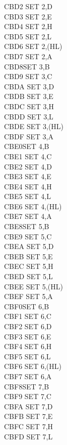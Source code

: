 \documentclass[twoside,openright,a4paper]{book}
\begin{document}
\begin{multicols}{3}
{\begin{tabbing}
	CBD2\> 	SET 2,D\\
	CBD3\> 	SET 2,E\\
	CBD4\> 	SET 2,H\\
	CBD5\> 	SET 2,L\\
	CBD6\> 	SET 2,(HL)\\
	CBD7\> 	SET 2,A\\
	CBD8\>SET 3,B\\
	CBD9\> 	SET 3,C\\
	CBDA\> 	SET 3,D\\
	CBDB\> 	SET 3,E\\
	CBDC\> 	SET 3,H\\
	CBDD\> 	SET 3,L\\
	CBDE\> 	SET 3,(HL)\\
	CBDF\> 	SET 3,A\\
	CBE0\>SET 4,B\\
	CBE1\> 	SET 4,C\\
	CBE2\> 	SET 4,D\\
	CBE3\> 	SET 4,E\\
	CBE4\> 	SET 4,H\\
	CBE5\> 	SET 4,L\\
	CBE6\> 	SET 4,(HL)\\
	CBE7\> 	SET 4,A\\
	CBE8\>SET 5,B\\
	CBE9\> 	SET 5,C\\
	CBEA\> 	SET 5,D\\
	CBEB\> 	SET 5,E\\
	CBEC\> 	SET 5,H\\
	CBED\> 	SET 5,L\\
	CBEE\> 	SET 5,(HL)\\
	CBEF\> 	SET 5,A\\
	CBF0\>SET 6,B\\
	CBF1\> 	SET 6,C\\
	CBF2\> 	SET 6,D\\
	CBF3\> 	SET 6,E\\
	CBF4\> 	SET 6,H\\
	CBF5\> 	SET 6,L\\
	CBF6\> 	SET 6,(HL)\\
	CBF7\> 	SET 6,A\\
	CBF8\>SET 7,B\\
	CBF9\> 	SET 7,C\\
	CBFA\> 	SET 7,D\\
	CBFB\> 	SET 7,E\\
	CBFC\> 	SET 7,H\\
	CBFD\> 	SET 7,L\\

\end{tabbing}}
\end{multicols}
\end{document}

